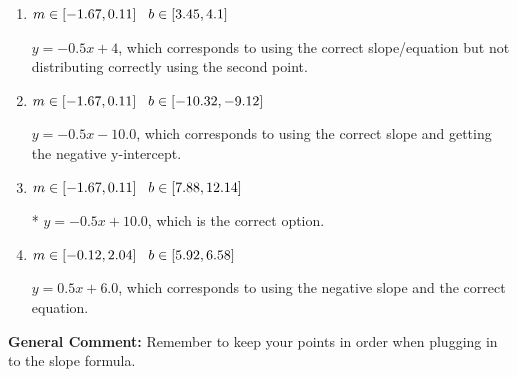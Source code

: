 \documentclass{extbook}[14pt]
\begin{document}
\begin{enumerate}
{\begin{enumerate}[label=\Alph*.]
 $y = -0.5x + 7$, which corresponds to using the correct slope/equation but not distributing correctly using the first point.
\item \( m \in [-1.67, 0.11] \hspace*{3mm} b \in [3.45, 4.1] \)

 $y = -0.5x + 4$, which corresponds to using the correct slope/equation but not distributing correctly using the second point.
\item \( m \in [-1.67, 0.11] \hspace*{3mm} b \in [-10.32, -9.12] \)

 $y = -0.5x -10.0$, which corresponds to using the correct slope and getting the negative y-intercept.
\item \( m \in [-1.67, 0.11] \hspace*{3mm} b \in [7.88, 12.14] \)

* $y = -0.5x + 10.0$, which is the correct option.
\item \( m \in [-0.12, 2.04] \hspace*{3mm} b \in [5.92, 6.58] \)

 $y = 0.5x + 6.0$, which corresponds to using the negative slope and the correct equation.
\end{enumerate}

\textbf{General Comment:} Remember to keep your points in order when plugging in to the slope formula.
}
\end{enumerate}
\end{document}
